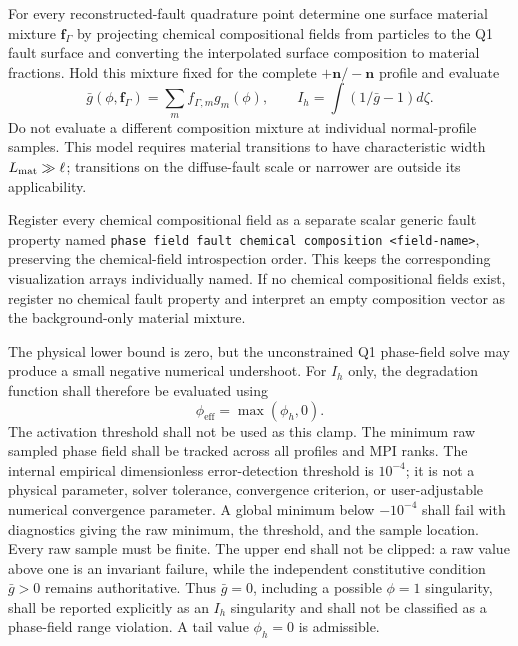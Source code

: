 \documentclass[11pt]{article}
\begin{document}
For every reconstructed-fault quadrature point determine one surface material
mixture $\mathbf f_\Gamma$ by projecting chemical compositional fields from
particles to the Q1 fault surface and converting the interpolated surface
composition to material fractions. Hold this mixture fixed for the complete
$+\mathbf n/-\mathbf n$ profile and evaluate
\[
\bar g(\phi,\mathbf f_\Gamma)=\sum_m f_{\Gamma,m}g_m(\phi),\qquad
I_h=\int\left(1/\bar g-1\right)d\zeta.
\]
Do not evaluate a different composition mixture at individual normal-profile
samples. This model requires material transitions to have characteristic width
$L_{\rm mat}\gg\ell$; transitions on the diffuse-fault scale or narrower are
outside its applicability.

Register every chemical compositional field as a separate scalar generic fault
property named
\texttt{phase field fault chemical composition <field-name>}, preserving the
chemical-field introspection order. This keeps the corresponding visualization
arrays individually named. If no chemical compositional fields exist, register
no chemical fault property and interpret an empty composition vector as the
background-only material mixture.

The physical lower bound is zero, but the unconstrained Q1 phase-field solve
may produce a small negative numerical undershoot. For $I_h$ only, the
degradation function shall therefore be evaluated using
\[
\phi_{\mathrm{eff}}=\max(\phi_h,0).
\]
The activation threshold shall not be used as this clamp. The minimum raw
sampled phase field shall be tracked across all profiles and MPI ranks. The
internal empirical dimensionless error-detection threshold is $10^{-4}$; it
is not a physical parameter, solver tolerance, convergence criterion, or
user-adjustable numerical convergence parameter. A global minimum below
$-10^{-4}$ shall fail with diagnostics giving the raw minimum, the threshold,
and the sample location. Every raw sample must be finite. The upper end shall
not be clipped: a raw value above one is an
invariant failure, while the independent constitutive condition $\bar g>0$
remains authoritative. Thus $\bar g=0$, including a possible $\phi=1$
singularity, shall be reported explicitly as an $I_h$ singularity and shall
not be classified as a phase-field range violation. A tail value $\phi_h=0$
is admissible.
\end{document}
